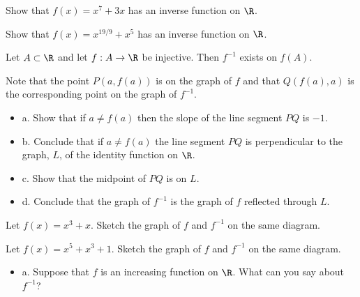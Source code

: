 \begin{theorem}
\begin{theorem}
\begin{theorem}
\begin{theorem}
\begin{theorem}
\begin{exercises}
\begin{exercise}
\begin{exercise}
\begin{exercise}
\begin{exercise}
\begin{exercise}
\begin{exercise}
\begin{exercise}
\begin{exercise}
\begin{exercise}
\begin{exercise}
\begin{exercise}
\begin{exercise}
\begin{exercise}
\begin{exercise}
\begin{exercise}
\begin{exercise}
\begin{exercise}
\begin{exercise}
\begin{exercise}
\begin{exercise} Show that $f(x) =x^7 + 3x $ has an inverse
function on $\R$.

\begin{exercise} Show that $f(x) =x^{19/9} +x^5 $ has an inverse
function on $\R$. 

\begin{exercise}\label{exer:reflection} 
Let $A\subset \R$ and let $f: A\to\R$ be
injective.  Then $f^{-1}$ exists on $f(A)$.

\item{}
Note that the point $P(a, f(a)) $ is on the graph of $f$ and that
$Q(f(a), a) $ is the corresponding point on the graph of $f^{-1} $.
\label{exer:inverse is reflection}
\begin{itemize} %

\item{a.} Show that if $a\neq f(a)$ then the slope of the line segment
$PQ$ is $-1 $.

\item{b.} Conclude that if $a\neq f(a)$ the line segment $PQ$ is
perpendicular to the graph, $L$,  of the identity function on
$\R$.

\item{c.} Show that the midpoint of $PQ$ is on $L$.

\item{d.} Conclude that the graph of $f^{-1}$ is the graph of $f$
reflected through $L$.
 
\end{itemize}

\begin{exercise} Let $f(x) =x^3 +x $. Sketch the graph of $f$ and
 $f^{-1} $ on the same diagram.

\begin{exercise} Let $f(x) =x^5 + x^3 +1 $. Sketch the graph of $f$ and
 $f^{-1} $ on the same diagram. 

\begin{exercise} 
\begin{itemize} %

\item{a.} Suppose that $f$ is an increasing function on $\R$. What can
 you say about $f^{-1}$?


\end{itemize}
\end{exercise}
\end{exercise}
\end{exercise}
\end{exercise}
\end{exercise}
\end{exercise}
\end{exercise}
\end{exercise}
\end{exercise}
\end{exercise}
\end{exercise}
\end{exercise}
\end{exercise}
\end{exercise}
\end{exercise}
\end{exercise}
\end{exercise}
\end{exercise}
\end{exercise}
\end{exercise}
\end{exercise}
\end{exercise}
\end{exercise}
\end{exercise}
\end{exercise}
\end{exercises}
\end{theorem}
\end{theorem}
\end{theorem}
\end{theorem}
\end{theorem}
